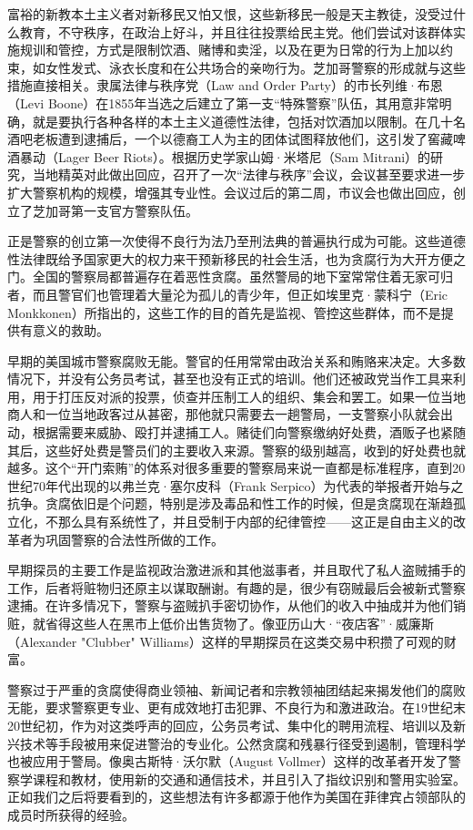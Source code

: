 \documentclass[fontset=fandol, a4paper, 12pt, openright]{ctexbook}
\begin{document}
富裕的新教本土主义者对新移民又怕又恨，这些新移民一般是天主教徒，没受过什么教育，不守秩序，在政治上好斗，并且往往投票给民主党。他们尝试对该群体实施规训和管控，方式是限制饮酒、赌博和卖淫，以及在更为日常的行为上加以约束，如女性发式、泳衣长度和在公共场合的亲吻行为。芝加哥警察的形成就与这些措施直接相关。隶属法律与秩序党（Law and Order Party）的市长列维·布恩（Levi Boone）在1855年当选之后建立了第一支“特殊警察”队伍，其用意非常明确，就是要执行各种各样的本土主义道德性法律，包括对饮酒加以限制。在几十名酒吧老板遭到逮捕后，一个以德裔工人为主的团体试图释放他们，这引发了窖藏啤酒暴动（Lager Beer Riots）。根据历史学家山姆·米塔尼（Sam Mitrani）的研究，当地精英对此做出回应，召开了一次“法律与秩序”会议，会议甚至要求进一步扩大警察机构的规模，增强其专业性。会议过后的第二周，市议会也做出回应，创立了芝加哥第一支官方警察队伍。

正是警察的创立第一次使得不良行为法乃至刑法典的普遍执行成为可能。这些道德性法律既给予国家更大的权力来干预新移民的社会生活，也为贪腐行为大开方便之门。全国的警察局都普遍存在着恶性贪腐。虽然警局的地下室常常住着无家可归者，而且警官们也管理着大量沦为孤儿的青少年，但正如埃里克·蒙科宁（Eric Monkkonen）所指出的，这些工作的目的首先是监视、管控这些群体，而不是提供有意义的救助。

早期的美国城市警察腐败无能。警官的任用常常由政治关系和贿赂来决定。大多数情况下，并没有公务员考试，甚至也没有正式的培训。他们还被政党当作工具来利用，用于打压反对派的投票，侦查并压制工人的组织、集会和罢工。如果一位当地商人和一位当地政客过从甚密，那他就只需要去一趟警局，一支警察小队就会出动，根据需要来威胁、殴打并逮捕工人。赌徒们向警察缴纳好处费，酒贩子也紧随其后，这些好处费是警员们的主要收入来源。警察的级别越高，收到的好处费也就越多。这个“开门索贿”的体系对很多重要的警察局来说一直都是标准程序，直到20世纪70年代出现的以弗兰克·塞尔皮科（Frank Serpico）为代表的举报者开始与之抗争。贪腐依旧是个问题，特别是涉及毒品和性工作的时候，但是贪腐现在渐趋孤立化，不那么具有系统性了，并且受制于内部的纪律管控——这正是自由主义的改革者为巩固警察的合法性所做的工作。

早期探员的主要工作是监视政治激进派和其他滋事者，并且取代了私人盗贼捕手的工作，后者将赃物归还原主以谋取酬谢。有趣的是，很少有窃贼最后会被新式警察逮捕。在许多情况下，警察与盗贼扒手密切协作，从他们的收入中抽成并为他们销赃，就省得这些人在黑市上低价出售货物了。像亚历山大·“夜店客”·威廉斯（Alexander "Clubber" Williams）这样的早期探员在这类交易中积攒了可观的财富。

警察过于严重的贪腐使得商业领袖、新闻记者和宗教领袖团结起来揭发他们的腐败无能，要求警察更专业、更有成效地打击犯罪、不良行为和激进政治。在19世纪末20世纪初，作为对这类呼声的回应，公务员考试、集中化的聘用流程、培训以及新兴技术等手段被用来促进警治的专业化。公然贪腐和残暴行径受到遏制，管理科学也被应用于警局。像奥古斯特·沃尔默（August Vollmer）这样的改革者开发了警察学课程和教材，使用新的交通和通信技术，并且引入了指纹识别和警用实验室。正如我们之后将要看到的，这些想法有许多都源于他作为美国在菲律宾占领部队的成员时所获得的经验。
\end{document}
